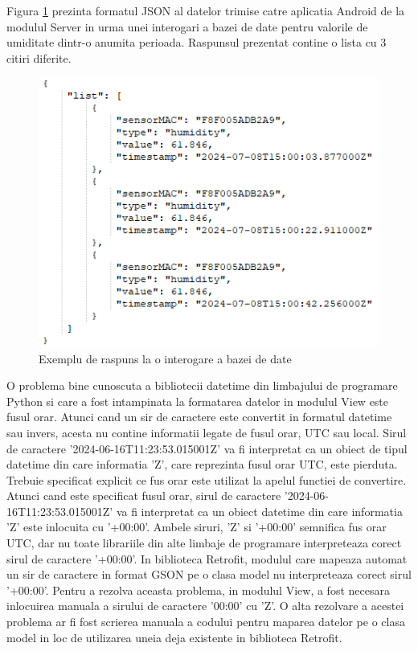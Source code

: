 Figura \ref{fig:Server2AndroidDataFormat} prezinta formatul JSON al datelor trimise catre aplicatia Android de la modulul Server in urma unei interogari a bazei de 
date pentru valorile de umiditate dintr-o anumita perioada. Raspunsul prezentat contine o lista cu 3 citiri diferite.
\begin{figure}[H]
    \centering
    \includegraphics[scale=0.8]{figs/Server2AndroidDataFormat.png}
    \caption{Exemplu de raspuns la o interogare a bazei de date}
    \label{fig:Server2AndroidDataFormat}
\end{figure}

O problema bine cunoscuta a bibliotecii datetime din limbajului de programare Python si care a fost intampinata la formatarea datelor in modulul View este fusul orar. 
Atunci cand un sir de caractere este convertit in formatul datetime sau invers, acesta nu contine informatii legate de fusul orar, UTC sau local. Sirul de caractere 
'2024-06-16T11:23:53.015001Z' va fi interpretat ca un obiect de tipul datetime din care informatia 'Z', care reprezinta fusul orar UTC, este pierduta. 
Trebuie specificat explicit ce fus orar este utilizat la apelul functiei de convertire. Atunci cand este specificat fusul orar, sirul de caractere 
'2024-06-16T11:23:53.015001Z' va fi interpretat ca un obiect datetime din care informatia 'Z' este inlocuita cu '+00:00'. Ambele siruri, 'Z' si '+00:00' semnifica fus orar 
UTC, dar nu toate librariile din alte limbaje de programare interpreteaza corect sirul de caractere '+00:00'. In biblioteca Retrofit, modulul care mapeaza automat un sir de 
caractere in format GSON pe o clasa model nu interpreteaza corect sirul '+00:00'. Pentru a rezolva aceasta problema, in modulul View, a fost necesara inlocuirea manuala a sirului 
de caractere '00:00' cu 'Z'. O alta rezolvare a acestei problema ar fi fost scrierea manuala a codului pentru maparea datelor pe o clasa model in loc de utilizarea uneia deja 
existente in biblioteca Retrofit. 


